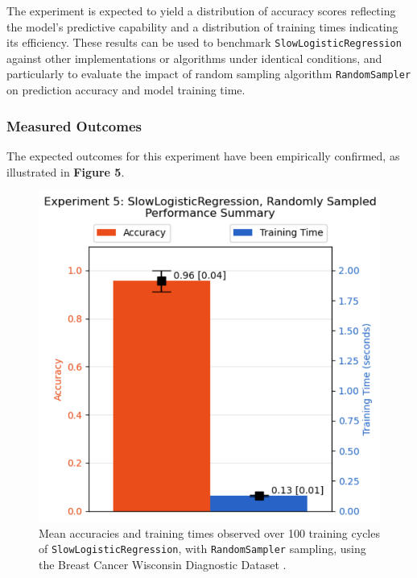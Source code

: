 \documentclass{article}
\theoremstyle{plain}
\theoremstyle{definition}
\theoremstyle{remark}
\begin{document}
The experiment is expected to yield a distribution of accuracy scores reflecting the model's predictive capability and a distribution of training times indicating its efficiency. These results can be used to benchmark \texttt{SlowLogisticRegression} against other implementations or algorithms under identical conditions, and particularly to evaluate the impact of random sampling algorithm \texttt{RandomSampler} on prediction accuracy and model training time.


\subsubsection{Measured Outcomes}

The expected outcomes for this experiment have been empirically confirmed, as illustrated in \textbf{Figure 5}.

\begin{figure}[ht]
	\vskip 0.2in
	\begin{center}
		\centerline{\includegraphics[width=\columnwidth]{experiment_05}}
		\caption{Mean accuracies and training times observed over 100 training cycles of \texttt{SlowLogisticRegression}, with \texttt{RandomSampler} sampling, using the Breast Cancer Wisconsin Diagnostic Dataset \cite{breastcancer}.}
		\label{experiment_05}
	\end{center}
	\vskip -0.2in
\end{figure}
\end{document}
